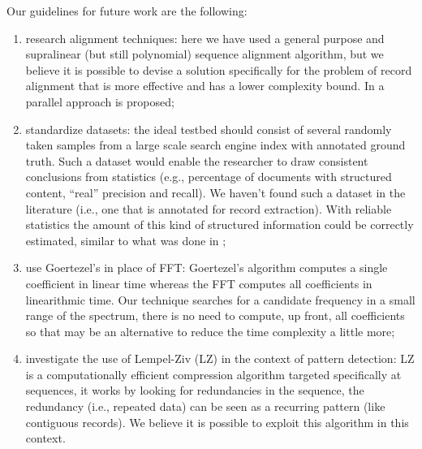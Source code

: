 \documentclass{vldb}
\begin{document}
Our guidelines for future work are the following:
\begin{enumerate}
  \item research alignment techniques: here we have used a general purpose and
  supralinear (but still polynomial) sequence alignment algorithm, but we
  believe it is possible to devise a solution specifically for the problem of
  record alignment that is more effective and has a lower complexity bound. In
  \cite{gfrerer2017parallel} a parallel approach is proposed;
  \item standardize datasets: the ideal testbed should consist of several
  randomly taken samples from a large scale search engine index with annotated
  ground truth.
  Such a dataset would enable the researcher to draw consistent conclusions
  from statistics (e.g., percentage of documents with structured content,
  ``real'' precision and recall). We haven't found such a dataset in the
  literature (i.e., one that is annotated for record extraction). With reliable
  statistics the amount of this kind of structured information could be
  correctly estimated, similar to what was done in \cite{webtables2008};
  \item use Goertezel's \cite{goertzel1958algorithm} in place of FFT:
  Goertezel's algorithm computes a single coefficient in linear time whereas the
  FFT computes all coefficients in linearithmic time. Our technique searches for a
  candidate frequency in a small range of the spectrum, there is no need to
  compute, up front, all coefficients so that may be an alternative to reduce
  the time complexity a little more;
  \item investigate the use of Lempel-Ziv\cite{ziv1977universal} (LZ) in the
  context of pattern detection: LZ is a computationally efficient compression
  algorithm targeted specifically at sequences, it works by looking for
  redundancies in the sequence, the redundancy (i.e., repeated data) can be seen
  as a recurring pattern (like contiguous records). We believe it is
  possible to exploit this algorithm in this context.
\end{enumerate}

\balance
 



\end{document}
